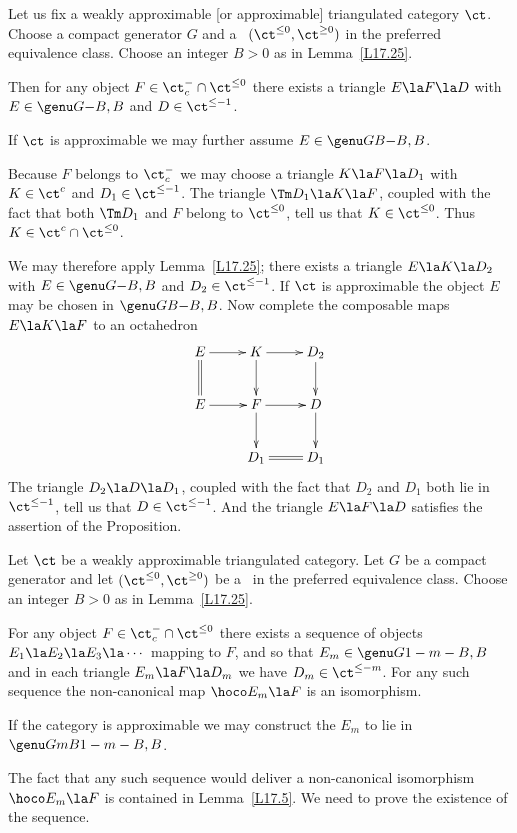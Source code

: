 \documentclass[11pt]{amsart}
\begin{document}
Let us fix a weakly approximable [or approximable]
triangulated category $\ct$. Choose a compact
generator $G$ and a \tstr\ $(\ct^{\leq0},\ct^{\geq0})$
in the preferred equivalence class. Choose an integer $B>0$
as in Lemma~\ref{L17.25}.

Then 
for any object $F\in\ct^-_c\cap\ct^{\leq0}$
there exists  a triangle
$E\la F\la D$ with $E\in\genu G{}{-B,B}$ and
$D\in\ct^{\leq-1}$.

If $\ct$ is approximable we may further assume $E\in\genu G{B}{-B,B}$.
\epro

\prf
Because $F$ belongs to $\ct^-_c$ we may choose a triangle
$K\la F\la D_1$ with $K\in\ct^c$ and $D_1\in\ct^{\leq-1}$. The
triangle $\Tm D_1\la K\la F$, coupled with the fact that
both $\Tm D_1$ and $F$ belong to $\ct^{\leq0}$, tell us that
$K\in\ct^{\leq0}$. Thus $K\in\ct^c\cap\ct^{\leq0}$.

We may therefore apply Lemma~\ref{L17.25}; there exists a triangle
$E\la K\la D_2$ with $E\in\genu G{}{-B,B}$ and $D_2\in\ct^{\leq-1}$.
If $\ct$ is approximable the object $E$ may be chosen
in $\genu GB{-B,B}$.
Now complete the composable maps $E\la K\la F$ to an octahedron
\[\xymatrix{
  E \ar[r]\ar@{=}[d] & K \ar[r] \ar[d] & D_2\ar[d]\\
  E\ar[r] & F \ar[d]\ar[r] & D\ar[d] \\
     & D_1\ar@{=}[r] & D_1
}\]
The triangle $D_2\la D\la D_1$, coupled with the fact
that $D_2$ and $D_1$ both
lie in $\ct^{\leq-1}$, tell us that $D\in\ct^{\leq-1}$.
And
the triangle $E\la F\la D$ satisfies the assertion of the Proposition.
\eprf

Let $\ct$ be a weakly approximable triangulated category.
Let $G$ be a compact generator and let $(\ct^{\leq0},\ct^{\geq0})$ be
a \tstr\ in the preferred equivalence class.
Choose an integer $B>0$
as in Lemma~\ref{L17.25}.

For any object
$F\in\ct^-_c\cap\ct^{\leq0}$
there exists a sequence of objects $E_1\la E_2\la E_3\la\cdots$
mapping to $F$, and so that $E_m\in\genu G{}{1-m-B,B}$ and
in each triangle $E_m\la F\la D_m$ we have $D_m\in\ct^{\leq-m}$.
For
any such sequence the
non-canonical map $\hoco E_m\la F$ is an isomorphism.

If the category is approximable we may construct the $E_m$ to lie
in $\genu G{mB}{1-m-B,B}$.
\ecor

\prf
The fact that any such sequence would deliver a non-canonical
isomorphism $\hoco E_m\la F$ is contained in Lemma~\ref{L17.5}.
We need to prove the existence of the sequence.
\end{document}
